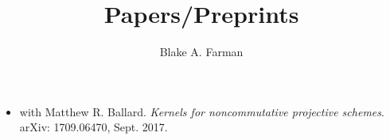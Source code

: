 \documentclass[11pt]{amsart}
\title{Papers/Preprints}
\author{Blake A. Farman}
\date{}
\begin{document}
\maketitle

\begin{itemize}
\item
  with Matthew R. Ballard. \textit{Kernels for noncommutative projective schemes}.
  arXiv: 1709.06470, Sept. 2017.
\end{itemize}
\end{document}
